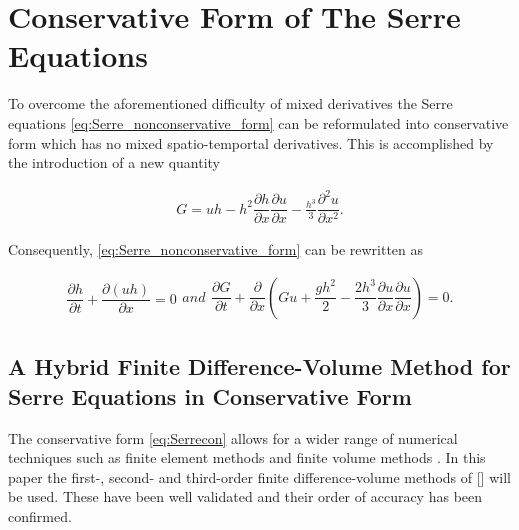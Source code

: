 \documentclass[SingleSpace,12pt,Proceedings]{Serre_ASCE}
\begin{document}
\section{Conservative Form of The Serre Equations}
To overcome the aforementioned difficulty of mixed derivatives the Serre equations \eqref{eq:Serre_nonconservative_form} can be reformulated into conservative form which has no mixed spatio-temportal derivatives. This is accomplished by the introduction of a new quantity \cite{Hank-etal-2010-2034,Zoppou-2014}
\begin{linenomath*}
\begin{gather}
\label{eq:Gdefinition}
G = uh - h^2 \dfrac{\partial h}{\partial x} \dfrac{\partial u}{\partial x} - \frac{h^3}{3} \dfrac{\partial^2 u}{\partial x^2}.
\end{gather}
\end{linenomath*}
Consequently, \eqref{eq:Serre_nonconservative_form} can be rewritten as
\begin{linenomath*}
\begin{subequations}
\begin{gather}
\dfrac{\partial h}{\partial t} + \dfrac{\partial (uh)}{\partial x} = 0
\label{eq:Serrecon_continuity}
\end{gather}
and
\begin{gather}
\dfrac{\partial G}{\partial t} + \dfrac{\partial}{\partial x}\left(Gu + \dfrac{gh^2}{2} - \dfrac{2h^3}{3}\dfrac{\partial u}{\partial x}\dfrac{\partial u}{\partial x}\right) = 0.
\label{eq:Serrecon_momentum}
\end{gather}
\label{eq:Serrecon}
\end{subequations}
\end{linenomath*}

\subsection{A Hybrid Finite Difference-Volume Method for Serre Equations in Conservative Form}
\label{section:hybridmethod}
The conservative form \eqref{eq:Serrecon} allows for a wider range of numerical techniques such as finite element methods \cite{Guyenne-etal-2014-169} and finite volume methods \cite{Hank-etal-2010-2034,Zoppou-2014}. In this paper the first-, second- and third-order finite difference-volume methods of [] will be used. These have been well validated and their order of accuracy has been confirmed.  
\end{document}

